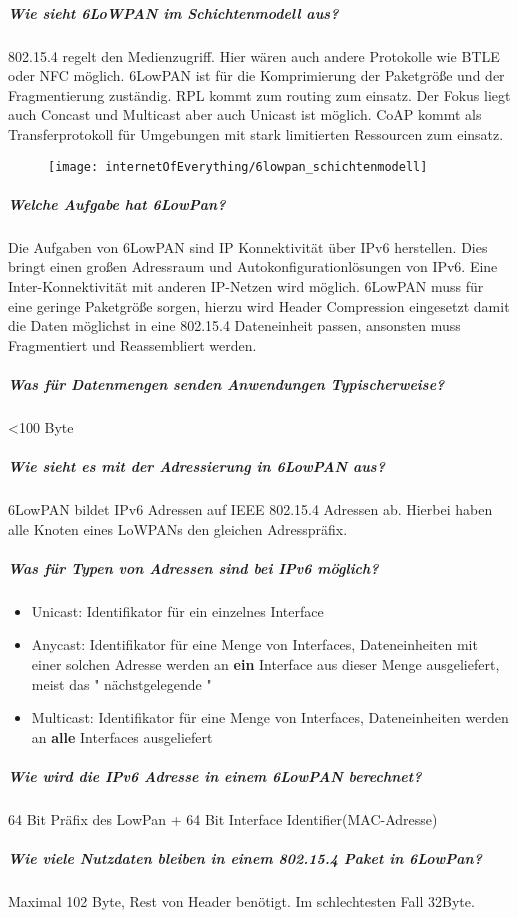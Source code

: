 	\subparagraph{Wie sieht 6LoWPAN im Schichtenmodell aus?}
	802.15.4  regelt den Medienzugriff. Hier wären auch andere Protokolle wie BTLE oder NFC möglich.
	6LowPAN ist für die Komprimierung der Paketgröße und der Fragmentierung zuständig.
	RPL kommt zum routing zum einsatz. Der Fokus liegt auch Concast und Multicast aber auch Unicast ist möglich.
	CoAP kommt als Transferprotokoll für Umgebungen mit stark limitierten Ressourcen zum einsatz.
	\begin{figure}[H]
		\centering
		\texttt{[image: internetOfEverything/6lowpan\_schichtenmodell]}
		
		
	\end{figure}
	
	\subparagraph{Welche Aufgabe hat 6LowPan?}
	Die Aufgaben von 6LowPAN sind IP Konnektivität über IPv6 herstellen. Dies bringt einen großen Adressraum und Autokonfigurationlösungen von IPv6. Eine Inter-Konnektivität mit anderen IP-Netzen wird möglich.
	6LowPAN muss für eine geringe Paketgröße sorgen, hierzu wird Header Compression eingesetzt damit die Daten möglichst in eine 802.15.4 Dateneinheit passen, ansonsten muss Fragmentiert und Reassembliert werden.
	
	\subparagraph{Was für Datenmengen senden Anwendungen Typischerweise?}
	<100 Byte
	
	\subparagraph{Wie sieht es mit der Adressierung in 6LowPAN aus?}
	6LowPAN bildet IPv6 Adressen auf IEEE 802.15.4 Adressen ab. Hierbei haben alle Knoten eines LoWPANs den gleichen Adresspräfix. 
	
	\subparagraph{Was für Typen von Adressen sind bei IPv6 möglich?}
	\begin{itemize}
		\item Unicast: Identifikator für ein einzelnes Interface
		\item Anycast: Identifikator für eine Menge von Interfaces, Dateneinheiten mit einer solchen Adresse werden an \textbf{ein} Interface aus dieser Menge ausgeliefert, meist das " nächstgelegende "
		\item Multicast: Identifikator für eine Menge von Interfaces, Dateneinheiten werden an \textbf{alle} Interfaces ausgeliefert
	\end{itemize}
	
	
	\subparagraph{Wie wird die IPv6 Adresse in einem 6LowPAN berechnet?}
	64 Bit Präfix des LowPan + 64 Bit Interface Identifier(MAC-Adresse)
	
	\subparagraph{Wie viele Nutzdaten bleiben in einem 802.15.4 Paket in 6LowPan?}
	Maximal 102 Byte, Rest von Header benötigt. Im schlechtesten Fall 32Byte.
	

